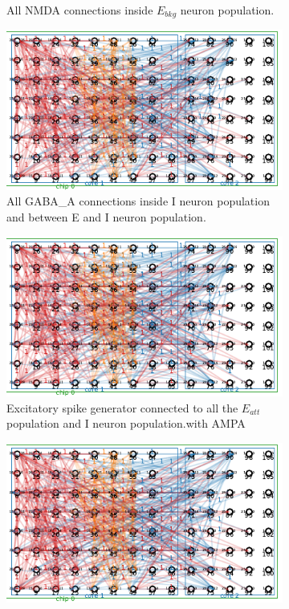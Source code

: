 \begin{figure}
\begin{subfigure}{0.5\textwidth}
		\caption{All NMDA connections inside $E_{bkg}$ neuron population.}
		\label{fig:NNonboard3}
	\end{subfigure}
	\begin{subfigure}{0.5\textwidth}
		\centering
		\includegraphics[page=4, width=\columnwidth]{./img/implementation/network.pdf}
		\caption{All GABA\_A connections inside I neuron population and between E and I neuron population.}
		\label{fig:NNonboard4}
	\end{subfigure}
	\begin{subfigure}{\textwidth}
		\centering
		\includegraphics[page=5, width=0.9\columnwidth]{./img/implementation/network.pdf}
		\caption{Excitatory spike generator connected to all the $E_{att}$ population and I neuron population.with AMPA}
		\label{fig:NNonboard5}
	\end{subfigure}
	\begin{subfigure}{\textwidth}
		\centering
		\includegraphics[page=6, width=0.9\columnwidth]{./img/implementation/network.pdf}

\end{subfigure}
\end{figure}
